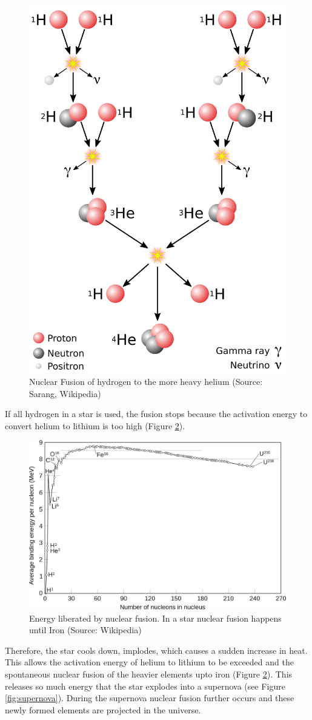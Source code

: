 \documentclass[
  11pt,
]{book}
\begin{document}
\begin{figure}

{\centering \includegraphics[width=0.5\linewidth]{./figs/fusion} 

}

\caption{Nuclear Fusion of hydrogen to the more heavy helium (Source: Sarang, Wikipedia)}\label{fig:nuclearFusion}
\end{figure}

If all hydrogen in a star is used, the fusion stops because the activation energy to convert helium to lithium is too high (Figure \ref{fig:fusionEnergy}).

\begin{figure}

{\centering \includegraphics[width=0.5\linewidth]{./figs/fusionEnergy} 

}

\caption{Energy liberated by nuclear fusion. In a star nuclear fusion happens until Iron (Source: Wikipedia)}\label{fig:fusionEnergy}
\end{figure}

Therefore, the star cools down, implodes, which causes a sudden increase in heat. This allows the activation energy of helium to lithium to be exceeded and the spontaneous nuclear fusion of the heavier elements upto iron (Figure \ref{fig:fusionEnergy}). This releases so much energy that the star explodes into a supernova (see Figure \ref{fig:supernova}). During the supernova nuclear fusion further occurs and these newly formed elements are projected in the universe.
\end{document}
